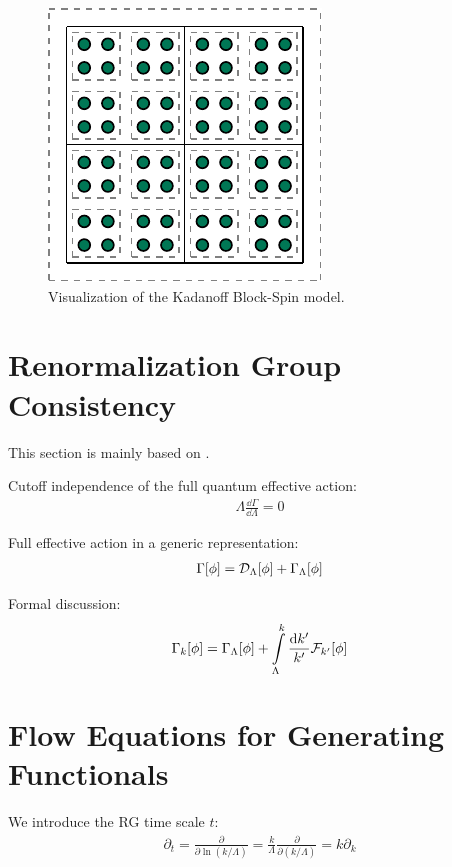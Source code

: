 \begin{figure}[H]
\centering
\includegraphics{figs/TikZ/block_spin_model}
\caption[Visualization of the Kadanoff Block-Spin model.]{Visualization of the Kadanoff Block-Spin model.\footnotemark}
\label{fig:kadanoff}
\end{figure}
\blindtext

\section{Renormalization Group Consistency}
This section is mainly based on \cite{BraunLeonhardtPawlowski2018}.

Cutoff independence of the full quantum effective action:
\begin{align}
	\Lambda\frac{\dd\Gamma}{\dd\Lambda} = 0
\end{align}

Full effective action in a generic representation:
\begin{align}
	\Gamma[\phi] = \mathcal{D}_{\Lambda}[\phi] + \Gamma_{\Lambda}[\phi]
\end{align}

Formal discussion:
\begin{align}
\Gamma_{k}[\phi] = \Gamma_{\Lambda}[\phi] + \int\limits_{\Lambda}^k \frac{\dd k'}{k'} \mathcal{F}_{k'}[\phi]
\end{align}
 
 
\section{Flow Equations for Generating Functionals}
We introduce the RG time scale $t$:
\begin{align}
	\partial_t = \frac{\partial}{\partial\ln(k/\Lambda)} = \frac{k}{\Lambda}\frac{\partial}{\partial(k/\Lambda)} = k \partial_k
\end{align}

